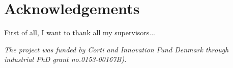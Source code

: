 \chapter[acknowledgements]{Acknowledgements}
First of all, I want to thank all my supervisors...


\vspace*{\fill}
\noindent \textit{The project was funded by Corti and Innovation Fund Denmark through industrial PhD grant no.\@ 0153-00167B).}
